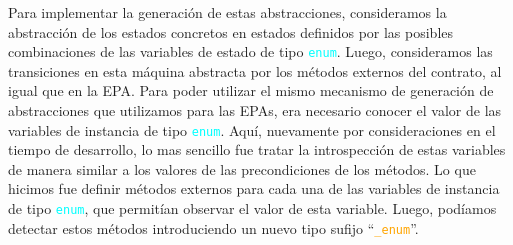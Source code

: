 Para implementar la generación de estas abstracciones, consideramos la abstracción de los estados concretos en estados definidos por las posibles combinaciones de las variables de estado de tipo \textcolor{cyan}{\texttt{enum}}.
Luego, consideramos las transiciones en esta máquina abstracta por los métodos externos del contrato, al igual que en la EPA.
Para poder utilizar el mismo mecanismo de generación de abstracciones que utilizamos para las EPAs, era necesario conocer el valor de las variables de instancia de tipo \textcolor{cyan}{\texttt{enum}}.
Aquí, nuevamente por consideraciones en el tiempo de desarrollo, lo mas sencillo fue tratar la introspección de estas variables de manera similar a los valores de las precondiciones de los métodos.
Lo que hicimos fue definir métodos externos para cada una de las variables de instancia de tipo \textcolor{cyan}{\texttt{enum}}, que permitían observar el valor de esta variable.
Luego, podíamos detectar estos métodos introduciendo un nuevo tipo sufijo ``\textcolor{orange}{\texttt{\_enum}}''.
